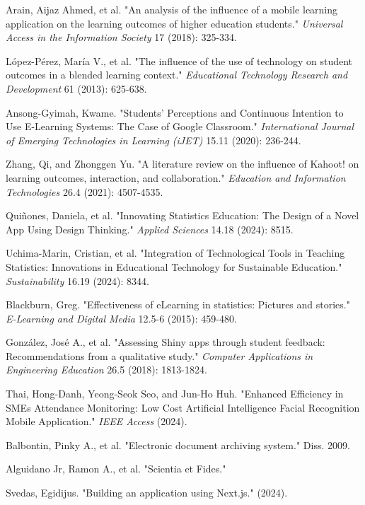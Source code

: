 \documentclass[conference,a4paper]{IEEEtran}
\begin{document}
\begin{thebibliography}{00}
   Arain, Aijaz Ahmed, et al. "An analysis of the influence of a mobile learning application on the learning outcomes of higher education students." \textit{Universal Access in the Information Society} 17 (2018): 325-334.

   López-Pérez, María V., et al. "The influence of the use of technology on student outcomes in a blended learning context." \textit{Educational Technology Research and Development} 61 (2013): 625-638.

   Ansong-Gyimah, Kwame. "Students’ Perceptions and Continuous Intention to Use E-Learning Systems: The Case of Google Classroom." \textit{International Journal of Emerging Technologies in Learning (iJET)} 15.11 (2020): 236-244.

   Zhang, Qi, and Zhonggen Yu. "A literature review on the influence of Kahoot! on learning outcomes, interaction, and collaboration." \textit{Education and Information Technologies} 26.4 (2021): 4507-4535.

   Quiñones, Daniela, et al. "Innovating Statistics Education: The Design of a Novel App Using Design Thinking." \textit{Applied Sciences} 14.18 (2024): 8515.

   Uchima-Marin, Cristian, et al. "Integration of Technological Tools in Teaching Statistics: Innovations in Educational Technology for Sustainable Education." \textit{Sustainability} 16.19 (2024): 8344.

   Blackburn, Greg. "Effectiveness of eLearning in statistics: Pictures and stories." \textit{E-Learning and Digital Media} 12.5-6 (2015): 459-480.

   González, José A., et al. "Assessing Shiny apps through student feedback: Recommendations from a qualitative study." \textit{Computer Applications in Engineering Education} 26.5 (2018): 1813-1824.

   Thai, Hong-Danh, Yeong-Seok Seo, and Jun-Ho Huh. "Enhanced Efficiency in SMEs Attendance Monitoring: Low Cost Artificial Intelligence Facial Recognition Mobile Application." \textit{IEEE Access} (2024).

   Balbontin, Pinky A., et al. "Electronic document archiving system." Diss. 2009.

   Alguidano Jr, Ramon A., et al. "Scientia et Fides."

   Svedas, Egidijus. "Building an application using Next.js." (2024).


\end{thebibliography}
\end{document}

